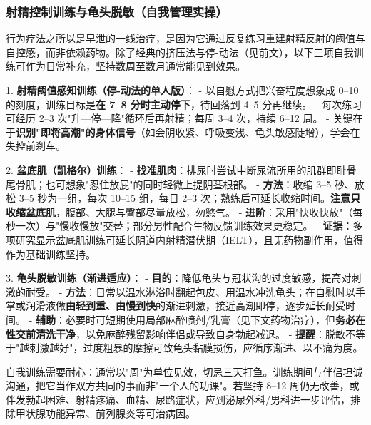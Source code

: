 \subsubsection{射精控制训练与龟头脱敏（自我管理实操）}

行为疗法之所以是早泄的一线治疗，是因为它通过反复练习重建射精反射的阈值与自控感，而非依赖药物。除了经典的挤压法与停-动法（见前文），以下三项自我训练可作为日常补充，坚持数周至数月通常能见到效果。

1. \textbf{射精阈值感知训练（停-动法的单人版）}：
   - 以自慰方式把兴奋程度想象成 0--10 的刻度，训练目标是\textbf{在 7--8 分时主动停下}，待回落到 4--5 分再继续。
   - 每次练习可经历 2--3 次"升—停—降"循环后再射精；每周 3--4 次，持续 6--12 周。
   - 关键在于\textbf{识别"即将高潮"的身体信号}（如会阴收紧、呼吸变浅、龟头敏感陡增），学会在失控前刹车。

2. \textbf{盆底肌（凯格尔）训练}：
   - \textbf{找准肌肉}：排尿时尝试中断尿流所用的肌群即耻骨尾骨肌；也可想象"忍住放屁"的同时轻微上提阴茎根部。
   - \textbf{方法}：收缩 3--5 秒、放松 3--5 秒为一组，每次 10--15 组，每日 2--3 次；熟练后可延长收缩时间。\textbf{注意只收缩盆底肌}，腹部、大腿与臀部尽量放松，勿憋气。
   - \textbf{进阶}：采用"快收快放"（每秒一次）与"慢收慢放"交替；部分男性配合生物反馈训练效果更稳定。
   - \textbf{证据}：多项研究显示盆底肌训练可延长阴道内射精潜伏期（IELT），且无药物副作用，值得作为基础训练坚持。

3. \textbf{龟头脱敏训练（渐进适应）}：
   - \textbf{目的}：降低龟头与冠状沟的过度敏感，提高对刺激的耐受。
   - \textbf{方法}：日常以温水淋浴时翻起包皮、用温水冲洗龟头；在自慰时以手掌或润滑液做\textbf{由轻到重、由慢到快}的渐进刺激，接近高潮即停，逐步延长耐受时间。
   - \textbf{辅助}：必要时可短期使用局部麻醉喷剂/乳膏（见下文药物治疗），但\textbf{务必在性交前清洗干净}，以免麻醉残留影响伴侣或导致自身勃起减退。
   - \textbf{提醒}：脱敏不等于"越刺激越好"，过度粗暴的摩擦可致龟头黏膜损伤，应循序渐进、以不痛为度。

\begin{tcolorbox}[colback=pink!5!white,colframe=red!50!black,title=贴心小叮咛]
自我训练需要耐心：通常以"周"为单位见效，切忌三天打鱼。训练期间与伴侣坦诚沟通，把它当作双方共同的事而非"一个人的功课"。若坚持 8--12 周仍无改善，或伴发勃起困难、射精疼痛、血精、尿路症状，应到泌尿外科/男科进一步评估，排除甲状腺功能异常、前列腺炎等可治病因。
\end{tcolorbox}